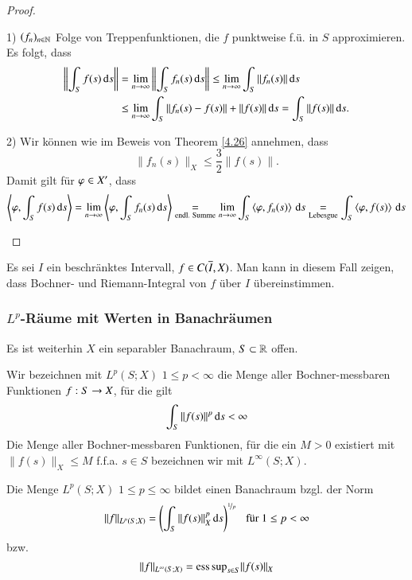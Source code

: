 \begin{proof}
    \begin{description}
    \item{1)}
    $(f_n)_{n\in \mathbb{N}}$ Folge von Treppenfunktionen, die $f$ punktweise f.ü. in $S$ approximieren.
    Es folgt, dass
    \begin{align*}
        \left\| \int_Sf(s)\, \mathrm{d} s\right\| &=\lim_{n\rightarrow\infty} \left\| \int_Sf_n(s) \, \mathrm{d} s\right\|
        \leq \lim_{n\rightarrow \infty} \int_S\|f_n(s)\| \, \mathrm{d} s\\
        &\leq \lim_{n\rightarrow \infty} \int_S \|f_n(s)-f(s)\| +\|f(s)\|\, \mathrm{d} s = \int_S \|f(s)\| \, \mathrm{d} s.
    \end{align*}
    \item{2)}
    Wir können wie im Beweis von Theorem \ref{4.26} annehmen, dass
    \[
        \|f_n(s)\|_X \leq \frac32 \|f(s)\|.
    \]
    Damit gilt für $\varphi \in X'$, dass
    \[
        \left\langle \varphi, \int_S f(s)\, \mathrm{d} s\right\rangle = \lim_{n\rightarrow \infty} \left\langle \varphi , \int_S f_n(s)\, \mathrm{d} s\right\rangle 
        \underset{\text{endl. Summe}}{=} \lim_{n\rightarrow \infty} \int_S \left\langle \varphi, f_n(s)\right\rangle \, \mathrm{d} s
        \underset{\text{Lebesgue}}{=} \int_S \left\langle \varphi, f(s)\right\rangle \, \mathrm{d} s
    \]
    \end{description}
    \[ \]
\end{proof}

\begin{remark}
    Es sei $I$ ein beschränktes Intervall, $f\in C(\overline I, X)$. Man kann in diesem Fall zeigen, dass
    Bochner- und Riemann-Integral von $f$ über $I$ übereinstimmen.
\end{remark}

\subsubsection*{$L^p$-Räume mit Werten in Banachräumen}

Es ist weiterhin $X$ ein separabler Banachraum, $S\subset \mathbb{R}$ offen.

\begin{defi}\label{4.28}
    Wir bezeichnen mit $L^p(S;X)$ $1\leq p<\infty$ die Menge aller Bochner-messbaren Funktionen
    $f:S\rightarrow X$, für die gilt
    \[
        \int_S \|f(s)\|^p \, \mathrm{d} s < \infty
    \]
    Die Menge aller Bochner-messbaren Funktionen, für die ein $M>0$ existiert mit $\|f(s)\|_X\leq M$ 
    f.f.a. $s\in S$ bezeichnen wir mit $L^\infty(S;X)$.
\end{defi}

\begin{theorem}\label{4.29}
    Die Menge $L^p(S;X)$ $1\leq p \leq \infty$ bildet einen Banachraum bzgl. der Norm
    \[
        \|f\|_{L^p(S;X)} = \left( \int_S \|f(s)\|_X^p\, \mathrm{d} s \right)^{\nicefrac1p} \hspace{.25cm} \text{für } 1\leq p 
        <\infty
    \]
    bzw. 
    \[
        \|f\|_{L^\infty(S;X)}=\mathrm{ess\, sup}_{s\in S} \|f(s)\|_X
    \]
\end{theorem}

